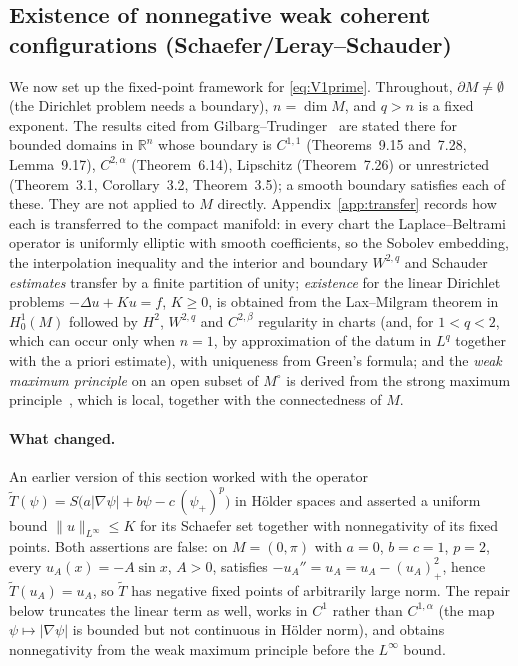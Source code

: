 \documentclass[11pt]{article}
\theoremstyle{plain}
\theoremstyle{definition}
\theoremstyle{remark}
\newcommand{\R}{\mathbb{R}}
\begin{document}
\subsection{Existence of nonnegative weak coherent configurations (Schaefer/Leray--Schauder)}\label{sec:existence}
We now set up the fixed-point framework for \eqref{eq:V1prime}. Throughout, \(\partial M\neq\emptyset\) (the Dirichlet problem needs a boundary), \(n=\dim M\), and \(q>n\) is a fixed exponent. The results cited from Gilbarg--Trudinger~\cite{GilbargTrudinger2001} are stated there for bounded domains in \(\R^n\) whose boundary is \(C^{1,1}\) (Theorems~9.15 and~7.28, Lemma~9.17), \(C^{2,\alpha}\) (Theorem~6.14), Lipschitz (Theorem~7.26) or unrestricted (Theorem~3.1, Corollary~3.2, Theorem~3.5); a smooth boundary satisfies each of these. They are not applied to \(M\) directly. Appendix~\ref{app:transfer} records how each is transferred to the compact manifold: in every chart the Laplace--Beltrami operator is uniformly elliptic with smooth coefficients, so the Sobolev embedding, the interpolation inequality and the interior and boundary \(W^{2,q}\) and Schauder \emph{estimates} transfer by a finite partition of unity; \emph{existence} for the linear Dirichlet problems \(-\Delta u+Ku=f\), \(K\ge 0\), is obtained from the Lax--Milgram theorem in \(H^1_0(M)\) followed by \(H^2\), \(W^{2,q}\) and \(C^{2,\beta}\) regularity in charts (and, for \(1<q<2\), which can occur only when \(n=1\), by approximation of the datum in \(L^q\) together with the a priori estimate), with uniqueness from Green's formula; and the \emph{weak maximum principle} on an open subset of \(M^\circ\) is derived from the strong maximum principle~\cite[Thm.~3.5]{GilbargTrudinger2001}, which is local, together with the connectedness of \(M\).

\paragraph{What changed.}
An earlier version of this section worked with the operator \(\widetilde T(\psi)=S\big(a|\nabla\psi|+b\psi-c\,(\psi_+)^p\big)\) in H\"older spaces and asserted a uniform bound \(\|u\|_{L^\infty}\le K\) for its Schaefer set together with nonnegativity of its fixed points. Both assertions are false: on \(M=(0,\pi)\) with \(a=0\), \(b=c=1\), \(p=2\), every \(u_A(x)=-A\sin x\), \(A>0\), satisfies \(-u_A''=u_A=u_A-(u_A)_+^2\), hence \(\widetilde T(u_A)=u_A\), so \(\widetilde T\) has negative fixed points of arbitrarily large norm. The repair below truncates the linear term as well, works in \(C^1\) rather than \(C^{1,\alpha}\) (the map \(\psi\mapsto|\nabla\psi|\) is bounded but not continuous in H\"older norm), and obtains nonnegativity from the weak maximum principle before the \(L^\infty\) bound.
\end{document}
